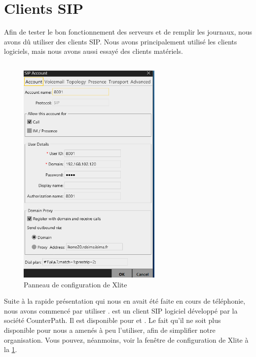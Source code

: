 \section{Clients SIP}

Afin de tester le bon fonctionnement des serveurs et de remplir les journaux, nous avons dû utiliser des clients SIP. Nous avons principalement utilisé les clients logiciels, mais nous avons aussi essayé des clients matériels.

\subsection{\xlite}

\begin{figure}[h]
\begin{center}
\includegraphics[width=7cm]{images/config-xlite.png}
\end{center}
\caption{Panneau de configuration de Xlite}
\label{confxlite}
\end{figure}

Suite à la rapide présentation qui nous en avait été faite en cours de téléphonie, nous avons commencé par utiliser {\xlite}. {\xlite} est un client SIP logiciel développé par la société CounterPath. Il est disponible pour {\win} et {\mac}. Le fait qu’il ne soit plus disponible pour {\lnx} nous a amenés à peu l’utiliser, afin de simplifier notre organisation. Vous pouvez, néanmoins, voir la fenêtre de configuration de Xlite à la \cref{confxlite}. 

